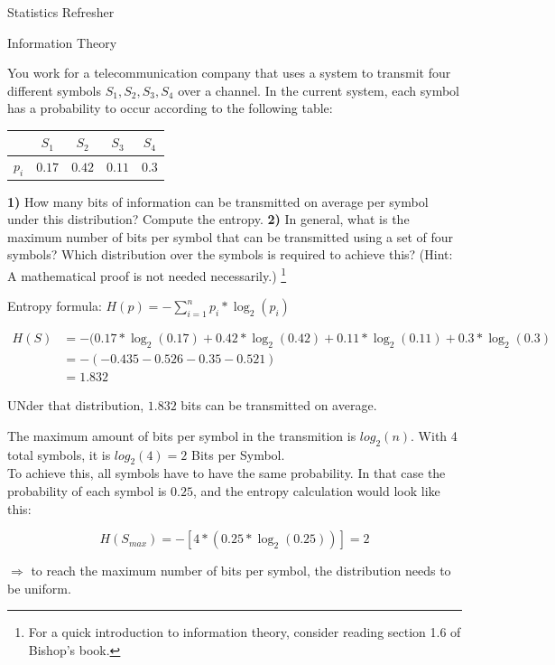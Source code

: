 \documentclass[
	english,
        solution=true
	]{tudaexercise}
\begin{document}
\begin{task}[points=15]{Statistics Refresher}
\begin{subtask}[points=7, title=Conditional Probability]
\begin{solution}
\end{solution}

\end{subtask}
\end{task}

\newpage

\begin{task}[points=5]{Information Theory}

\begin{subtask}[points=5,title=Entropy]
You work for a telecommunication company that uses a system to transmit four different symbols ${S_1, S_2, S_3, S_4}$ over a channel.
In the current system, each symbol has a probability to occur according to the following table:

\begin{center}
\begin{tabular}{r|cccc}
 & $S_1$ & $S_2$ & $S_3$ & $S_4$ \\
\hline
$p_i$ & $0.17$    & $0.42$    & $0.11$    & $0.3$
\end{tabular}
\end{center}
\textbf{1)} How many bits of information can be transmitted on average per symbol under
this distribution? Compute the entropy.
\textbf{2)} In general, what is the maximum number of bits per symbol that can be transmitted using a set of four symbols? Which
distribution over the symbols is required to achieve this? (Hint: A mathematical proof is not needed necessarily.)  \footnote{For a
    quick introduction to information theory, consider reading section 1.6 of
Bishop's book.}

\begin{solution}

    Entropy formula: $H(p)=-\sum^n_{i=1} p_i*\log_2(p_i)$

\begin{align*}
    H(S)&=-(0.17*\log_2(0.17)+0.42*\log_2(0.42)+0.11*\log_2(0.11)+0.3*\log_2(0.3)\\
    &=-(-0.435-0.526-0.35-0.521)\\
    &=1.832
\end{align*}

UNder that distribution, $1.832$ bits can be transmitted on average.
    
The maximum amount of bits per symbol in the transmition is $log_2(n)$. With 4 total symbols, it is $log_2(4)=2$ Bits per Symbol.\\

To achieve this, all symbols have to have the same probability. In that case the probability of each symbol is $0.25$, and the entropy calculation would look like this:

\[H(S_{max})=-[4*(0.25*\log_2(0.25))]=2\]

$\Rightarrow$ to reach the maximum number of bits per symbol, the distribution needs to be uniform.
\end{solution}
\end{subtask}
\end{task}
\end{document}
